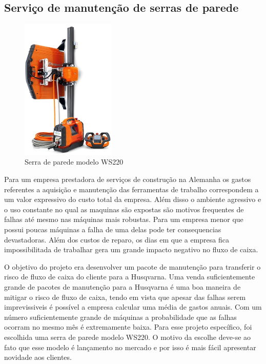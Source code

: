 \documentclass[12pt]{article}
\begin{document}
\subsection{Serviço de manutenção de serras de parede}

\begin{figure}[h!]
	\centering
	\includegraphics[width=0.4\textwidth]{img/ws220_produto.png}
	\caption{Serra de parede modelo WS220}
	\label{fig:ws220_produto}
\end{figure}

	Para um empresa prestadora de serviços de construção na Alemanha os gastos referentes a aquisição e manutenção das ferramentas de trabalho correspondem a um valor expressivo do custo total da empresa. Além disso o ambiente agressivo e o uso constante no qual as maquinas são expostas são motivos frequentes de falhas até mesmo nas máquinas mais robustas. Para um empresa menor que possui poucas máquinas a falha de uma delas pode ter consequencias devastadoras. Além dos custos de reparo, os dias em que a empresa fica impossibilitada de trabalhar gera um grande impacto negativo no fluxo de caixa.

	O objetivo do projeto era desenvolver um pacote de manutenção para transferir o risco de fluxo de caixa do cliente para a Husqvarna. Uma venda suficientemente grande de pacotes de manutenção para a Husqvarna é uma boa maneira de mitigar o risco de fluxo de caixa, tendo em vista que apesar das falhas serem imprevissiveis é possível a empresa calcular uma média de gastos anuais. Com um número suficientemente grande de máquinas a probabilidade que as falhas ocorram no mesmo mês é extremamente baixa. Para esse projeto específico, foi escolhida uma serra de parede modelo WS220. O motivo da escolhe deve-se ao fato que esse modelo é lançamento no mercado e por isso é mais fácil apresentar novidade aos clientes.
\end{document}
